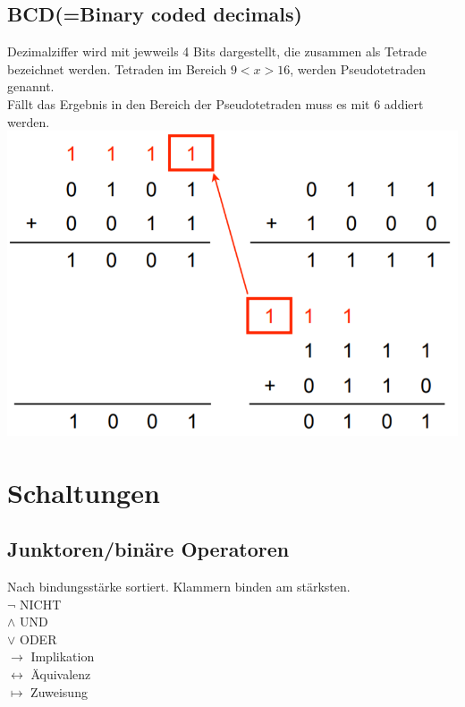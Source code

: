 \documentclass[12pt,a4paper]{article}
\begin{document}
	\subsection{BCD(=Binary coded decimals)}
		Dezimalziffer wird mit jewweils 4 Bits dargestellt, die zusammen als Tetrade bezeichnet werden. 
		Tetraden im Bereich $ 9<x>16$, werden Pseudotetraden genannt.\\
		Fällt das Ergebnis in den Bereich der 
		Pseudotetraden muss es mit 6 addiert werden.\\
		\includegraphics[scale=0.5]{Bilder/BCD-Add.png}

\section{Schaltungen}
	\subsection{Junktoren/binäre Operatoren}
		Nach bindungsstärke sortiert. Klammern binden am stärksten.\\
		\hspace{0.5cm} $\lnot$ NICHT\\
		\hspace{0.5cm} $\land$ UND\\
		\hspace{0.5cm} $\lor$ ODER\\
		\hspace{0.5cm} $\rightarrow$ Implikation\\
		\hspace{0.5cm} $\leftrightarrow$ Äquivalenz\\
		\hspace{0.5cm} $\longmapsto$ Zuweisung\\
\end{document}
